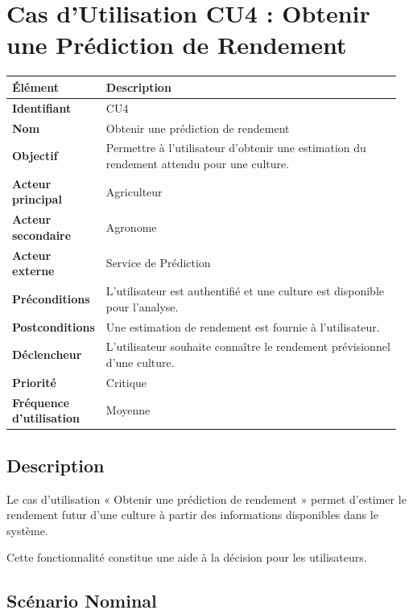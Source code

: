 \hypertarget{cas-dutilisation-cu4-obtenir-une-pruxe9diction-de-rendement}{%
\section{Cas d'Utilisation CU4 : Obtenir une Prédiction de
Rendement}\label{cas-dutilisation-cu4-obtenir-une-pruxe9diction-de-rendement}}

\begin{longtable}{@{}p{0.18\linewidth}p{0.78\linewidth}@{}}
\toprule
\rowcolors{2}{gray!10}{white}
\textbf{Élément} & \textbf{Description} \\
\midrule
\endhead
\textbf{Identifiant} & CU4 \\
\textbf{Nom} & Obtenir une prédiction de rendement \\
\textbf{Objectif} & Permettre à l'utilisateur d'obtenir une estimation
du rendement attendu pour une culture. \\
\textbf{Acteur principal} & Agriculteur \\
\textbf{Acteur secondaire} & Agronome \\
\textbf{Acteur externe} & Service de Prédiction \\
\textbf{Préconditions} & L'utilisateur est authentifié et une culture
est disponible pour l'analyse. \\
\textbf{Postconditions} & Une estimation de rendement est fournie à
l'utilisateur. \\
\textbf{Déclencheur} & L'utilisateur souhaite connaître le rendement
prévisionnel d'une culture. \\
\textbf{Priorité} & Critique \\
\textbf{Fréquence d'utilisation} & Moyenne \\
\bottomrule
\end{longtable}

\hypertarget{description-2}{%
\subsection{Description}\label{description-2}}

Le cas d'utilisation « Obtenir une prédiction de rendement » permet
d'estimer le rendement futur d'une culture à partir des informations
disponibles dans le système.

Cette fonctionnalité constitue une aide à la décision pour les
utilisateurs.

\hypertarget{scuxe9nario-nominal-3}{%
\subsection{Scénario Nominal}\label{scuxe9nario-nominal-3}}

